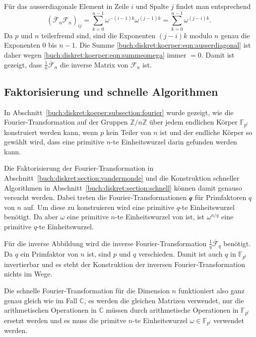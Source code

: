 Für das ausserdiagonale Element in Zeile $i$ und Spalte $j$
findet man entsprechend
\begin{equation}
(\overline{\mathscr{F}}_n
\mathscr{F}_n)_{i\!j}
=
\sum_{k=0}^{n-1}
\omega^{-(i-1)k}\omega^{(j-1)k}
=
\sum_{k=0}^{n-1} \omega^{(j-i)k}.
\label{buch:diskret:koerper:eqn:ausserdiagonal}
\end{equation}
Da $p$ und $n$ teilerfremd sind, sind die Exponenten $(j-i)k$
modulo $n$ genau die Exponenten $0$ bis $n-1$.
Die Summe
\eqref{buch:diskret:koerper:eqn:ausserdiagonal}
ist daher wegen
\eqref{buch:diskret:koerper:eqn:summeomega}
immer $=0$.
Damit ist gezeigt, dass $\frac1n\overline{\mathscr{F}}_n$ die
inverse Matrix von $\mathscr{F}_n$ ist.

%
%
\subsection{Faktorisierung und schnelle Algorithmen
\label{buch:diskret:koerper:subsection:faktorisierung}}
In Abschnitt~\ref{buch:diskret:koeper:subsection:fourier} wurde
gezeigt, wie die Fourier-Transformation auf der Gruppen
$\mathbb{Z}/n\mathbb{Z}$ über jedem endlichen Körper $\mathbb{F}_{p^l}$
konstruiert werden kann, wenn $p$ kein Teiler von $n$ ist und
der endliche Körper so gewählt wird, dass eine primitive $n$-te
Einheitswurzel darin gefunden werden kann.

Die Faktorisierung der Fourier-Transformation in
Abschnitt~\ref{buch:diskret:section:vandermonde}
und die Konstruktion schneller Algorithmen in
Abschnitt~\ref{buch:diskret:section:schnell} können damit
genauso versucht werden.
Dabei treten die Fourier-Transformationen $\mathscr{q}$ für Primfaktoren
$q$ von $n$ auf.
Um diese zu konstruieren wird eine primitive $q$-te Einheitswurzel benötigt.
Da aber $\omega$ eine primitive $n$-te Einheitswurzel von ist, ist
$\omega^{n/q}$ eine primitive $q$-te Einheitswurzel.

Für die inverse Abbildung wird die inverse Fourier-Transformation
$\frac{1}{q}\overline{\mathscr{F}}_q$ benötigt.
Da $q$ ein Primfaktor von $n$ ist, sind $p$ und $q$ verschieden.
Damit ist auch $q$ in $\mathbb{F}_{p^l}$ invertierbar und es steht
der Konstruktion der inversen Fourier-Transformation nichts im Wege.

Die schnelle Fourier-Transformation für die Dimension $n$ funktioniert
also ganz genau gleich wie im Fall $\mathbb{C}$, es werden die gleichen
Matrizen verwendet, nur die arithmetischen Operationen in $\mathbb{C}$
müssen durch arithmetische Operationen in $\mathbb{F}_{p^l}$ ersetzt
werden und es muss die primitve $n$-te Einheitswurzel
$\omega\in\mathbb{F}_{p^l}$ verwendet werden.

